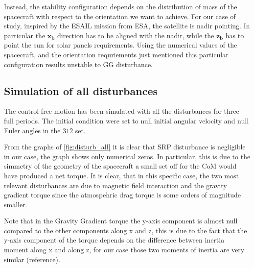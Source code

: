 Instead, the stability configuration depends on the distribution of mass of the spacecraft with respect to the orientation we want to achieve. For our case of study, 
inspired by the ESAIL mission from ESA, the satellite is nadir pointing. In particular the $\boldsymbol{x_b}$ direction has to be aligned with the nadir, while the $\boldsymbol{z_b}$ has to point the sun for solar panels requirements. Using the numerical values of the spacecraft, and the orientation requriements just mentioned
this particular configuration results unstable to GG disturbance.


\subsection{Simulation of all disturbances}
\label{subsec:sim_disturbances}


The control-free motion has been simulated with all the disturbances for three full periods. 
The initial condition were set to null initial angular velocity and 
null Euler angles in the $312$ set.

From the graphs of \autoref{fig:disturb_all} it is clear that SRP disturbance is negligible
in our case, the graph shows only numerical zeros. In particular, this is due to the simmetry of 
the geometry of the spacecraft a small set off for the CoM would have produced a net torque. 
It is clear, that in this specific case, the two most relevant disturbances are due to magnetic field
interaction and the gravity gradient torque since the atmospehric drag torque is some orders of magnitude 
smaller.

Note that in the Gravity Gradient torque the y-axis component is almost null compared to the other 
components along x and z, this is due to the fact that the y-axis component of the torque depends on 
the difference between inertia moment along x and along z, for our case those two moments of inertia are 
very similar (reference). 